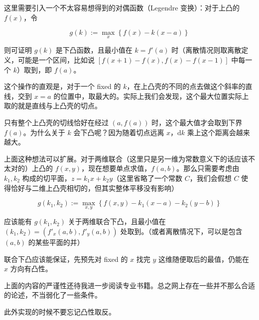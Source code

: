 这里需要引入一个不太容易想得到的对偶函数（Legendre 变换）：对于上凸的 $f(x)$，令

$$
g(k) := \max_{x}\left\{ f(x)-k(x-a) \right\}
$$

则可证明 $g(k)$ 是下凸函数，且最小值在 $k = f'(a)$ 时（离散情况则取离散定义，可能是一个区间，比如说 $\left[ f(x+1)-f(x),f(x)-f(x-1) \right]$ 中每一个 $k$）取到，即 $f(a)$。

这个操作的直观是，对于一个 fixed 的 $k$，在上凸壳的不同的点去做这个斜率的直线，交到 $x=a$ 的位置中，取最大的。实际上我们会发现，这个最大位置实际上取的就是直线与上凸壳的切点。

只有整个上凸壳的切线恰好在经过 $(a,f(a))$ 时，这个最大值才会取到下界 $f(a)$。为什么关于 $k$ 会下凸呢？因为随着切点远离 $x$，$\text{d}k$ 乘上这个距离会越来越大。

上面这种想法可以扩展。对于两维联合（这里只是另一维为常数意义下的话应该不太对的）上凸的 $f(x,y)$，现在想要单点求值，$f(a,b)$。那么只需要考虑由 $k_1,k_2$ 构成的切平面，$z = k_1 x + k_2 y$（这里省略了一个常数 $C$，我们会假想 $C$ 使得恰好与二维上凸壳相切的，但其实整体平移没有影响） 

$$
g(k_1,k_2) := \max_{x,y}\left\{ f(x,y)-k_1(x-a) - k_2(y-b) \right\}
$$

应该能有 $g(k_1,k_2)$ 关于两维联合下凸，且最小值在 $(k_1,k_2) = \left( f'_x(a,b), f'_y(a,b) \right)$ 处取到。（或者离散情况下，可以是包含 $(a,b)$ 的某些平面的并）

联合下凸应该能保证，先预先对 fixed 的 $x$ 找完 $y$ 这维随便取后的最值，仍能在 $x$ 方向有凸性。

上面的内容的严谨性还待我进一步阅读专业书籍。总之网上存在一些并不那么合适的论述，不当弱化了一些条件。

此外实现的时候不要忘记凸性取反。

